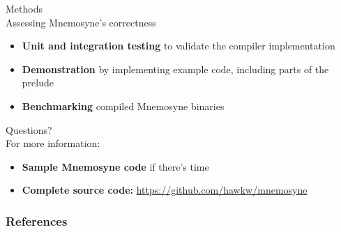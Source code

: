 \documentclass{beamer}
\begin{document}
\begin{frame}
\alert{\huge{Methods}}\\
\large{Assessing Mnemosyne's correctness}\normalsize
\begin{itemize}
    \item \textbf{Unit and integration testing} to validate the compiler implementation
    \item \textbf{Demonstration} by implementing example code, including parts of the prelude
    \item \textbf{Benchmarking} compiled Mnemosyne binaries
\end{itemize}
\end{frame}

\begin{frame}
\alert{\huge{Questions?}}\\
\large{For more information:}\normalsize
\begin{itemize}
    \item \textbf{Sample Mnemosyne code} if there's time
    \item \textbf{Complete source code:} \url{https://github.com/hawkw/mnemosyne}
\end{itemize}
\end{frame}

\begin{frame}[t,allowframebreaks]
    \frametitle{\huge{References}}
    \scriptsize
    \printbibliography
\end{frame}
\end{document}
